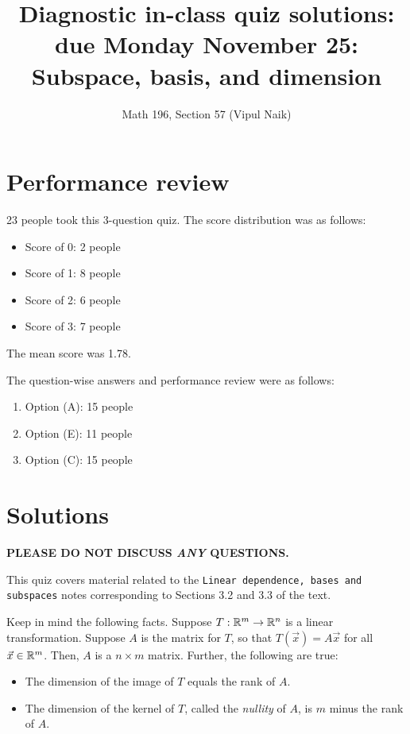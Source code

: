 \documentclass[10pt]{amsart}
\title{Diagnostic in-class quiz solutions: due Monday November 25: Subspace, basis, and dimension}
\author{Math 196, Section 57 (Vipul Naik)}
\begin{document}
\maketitle

\section{Performance review}

23 people took this 3-question quiz. The score distribution was as follows:

\begin{itemize}
\item Score of 0: 2 people
\item Score of 1: 8 people
\item Score of 2: 6 people
\item Score of 3: 7 people
\end{itemize}

The mean score was 1.78.

The question-wise answers and performance review were as follows:

\begin{enumerate}
\item Option (A): 15 people %
\item Option (E): 11 people %
\item Option (C): 15 people %
\end{enumerate}

\section{Solutions}

{\bf PLEASE DO NOT DISCUSS {\em ANY} QUESTIONS.}

This quiz covers material related to the {\tt Linear dependence, bases
  and subspaces} notes corresponding to Sections 3.2 and 3.3 of the
text.

Keep in mind the following facts. Suppose $T:\mathbb{R}^m \to \mathbb{R}^n$ is a
linear transformation. Suppose $A$ is the matrix for $T$, so that
$T(\vec{x}) = A\vec{x}$ for all $\vec{x} \in \mathbb{R}^m$. Then, $A$ is a $n
\times m$ matrix. Further, the following are true:

\begin{itemize}
\item The dimension of the image of $T$ equals the rank of $A$.
\item The dimension of the kernel of $T$, called the {\em nullity} of
  $A$, is $m$ minus the rank of $A$.
\end{itemize}
\end{document}
